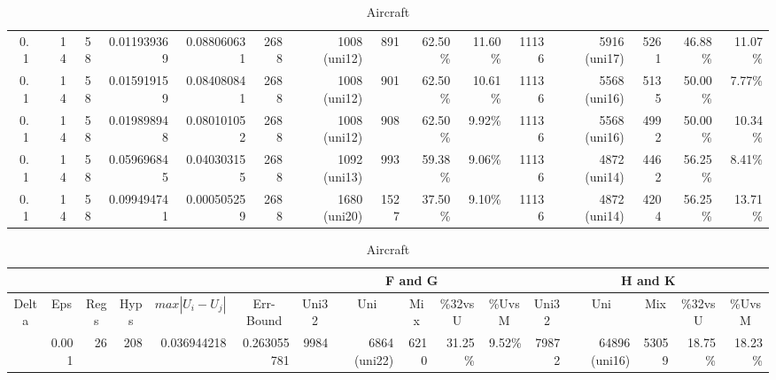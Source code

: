 \begin{landscape}
\begin{table}[p]
\begin{tabular}{rrrrrrrrrrrrrrrr}
		
		0.1 & \color{red}{0.0006} & 14 & 58 & 0.011939369 & 0.088060631 & 2688 & 1008 (uni12) & 891 & 62.50\% & 11.60\% & 11136 & 5916 (uni17) & 5261 & 46.88\% & 11.07\% \\
		
		0.1 & \color{red}{0.0008} & 14 & 58 & 0.015919159 & 0.084080841 & 2688 & 1008 (uni12) & 901 & 62.50\% & 10.61\% & 11136 & 5568 (uni16) & 5135 & 50.00\% & 7.77\% \\
		
		0.1 & \color{red}{0.0010} & 14 & 58 & 0.019898948 & 0.080101052 & 2688 & 1008 (uni12) & 908 & 62.50\% & 9.92\% & 11136 & 5568 (uni16) & 4992 & 50.00\% & 10.34\% \\
		
		0.1 & \color{red}{0.0030} & 14 & 58 & 0.059696845 & 0.040303155 & 2688 &  1092 (uni13) & 993 & 59.38\% & 9.06\% & 11136 & 4872 (uni14) & 4462 & 56.25\% & 8.41\% \\
		
		0.1 & \color{red}{0.0050} & 14 & 58 & 0.099494741 & 0.000505259 & 2688 & 1680 (uni20) & 1527 & 37.50\% & 9.10\% & 11136 & 4872 (uni14) & 4204 & 56.25\% & 13.71\% \\
		
	\end{tabular}
	\vspace*{1 cm}
	\centering
	\caption{Aircraft}
	\label{tab:aircraft}
	\begin{tabular}{rrrrrrrrrrrrrrrr}
		\cline{7-11}
		\cline{12-16}
		\multicolumn{4}{c}{} &
		\multicolumn{2}{c}{} &
		\multicolumn{5}{c|}{F and G} &
		\multicolumn{5}{c}{H and K} \\
		\hline
		\multicolumn{1}{c}{Delta}&
		\multicolumn{1}{c}{Eps} &
		\multicolumn{1}{c}{Regs} &
		\multicolumn{1}{c}{Hyps} &
		\multicolumn{1}{c}{$max|U_{i}-U_{j}|$} &
		\multicolumn{1}{c}{Err-Bound} &
		\multicolumn{1}{c}{Uni32}&
		\multicolumn{1}{c}{Uni}&
		\multicolumn{1}{c}{Mix}&
		\multicolumn{1}{c}{\%32vsU}&
		\multicolumn{1}{c}{\%UvsM}&
		\multicolumn{1}{c}{Uni32}&
		\multicolumn{1}{c}{Uni}&
		\multicolumn{1}{c}{Mix}&
		\multicolumn{1}{c}{\%32vsU}&
		\multicolumn{1}{c}{\%UvsM} \\
		\hline
		
		\color{red}{0.30} & 0.001 & 26 & 208 & 0.036944218 & 0.263055781 & 9984 & 6864 (uni22) & 6210 & 31.25\% & 9.52\% & 79872 & 64896 (uni16) & 53059 & 18.75\% & 18.23\% \\
		

\end{tabular}
\end{table}
\end{landscape}
